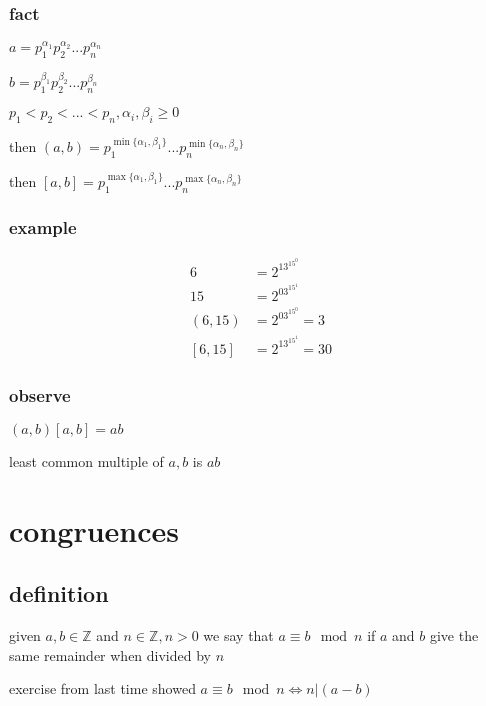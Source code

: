 \documentclass[letterpaper]{article}
\begin{document}
\subsubsection*{fact}
$a=p_1^{\alpha_1}p_2^{\alpha_2}...p_n^{\alpha_n}$

$b=p_1^{\beta_1}p_2^{\beta_2}...p_n^{\beta_n}$

$p_1<p_2<...<p_n, \alpha_i,\beta_i\ge 0$

then $(a,b)=p_1^{\min\{\alpha_1,\beta_1\}}...p_n^{\min\{\alpha_n,\beta_n\}}$

then $[a,b]=p_1^{\max\{\alpha_1,\beta_1\}}...p_n^{\max\{\alpha_n,\beta_n\}}$
\subsubsection*{example}
\begin{align*}
  6&=2^13^15^0\\
  15&=2^03^15^1\\
  (6,15)&=2^03^15^0=3\\
  [6,15]&=2^13^15^1=30
\end{align*}
\subsubsection*{observe}
$(a,b)[a,b]=ab$

least common multiple of $a,b$ is $ab$
\section*{congruences}
\subsection*{definition}
given $a,b\in\mathbb{Z}$ and $n\in\mathbb{Z}, n>0$ we say that $a\equiv b \mod n$ if $a$ and $b$ give the same remainder when divided by $n$ 

exercise from last time showed $a\equiv b \mod n\Leftrightarrow n|(a-b)$
\end{document}
